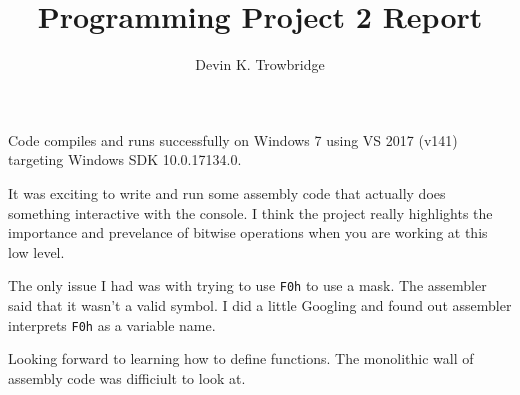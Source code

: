 \documentclass[a4paper,10pt]{article}
\title{Programming Project 2 Report}
\author{Devin K. Trowbridge}
\begin{document}
\maketitle

Code compiles and runs successfully on Windows 7 using VS 2017 (v141) targeting Windows SDK 10.0.17134.0.

It was exciting to write and run some assembly code that actually does something interactive with the console. I think the project really highlights the importance and prevelance of bitwise operations when you are working at this low level.

The only issue I had was with trying to use \verb|F0h| to use a mask. The assembler said that it wasn't a valid symbol. I did a little Googling and found out assembler interprets \verb|F0h| as a variable name.

Looking forward to learning how to define functions. The monolithic wall of assembly code was difficiult to look at.
\end{document}
